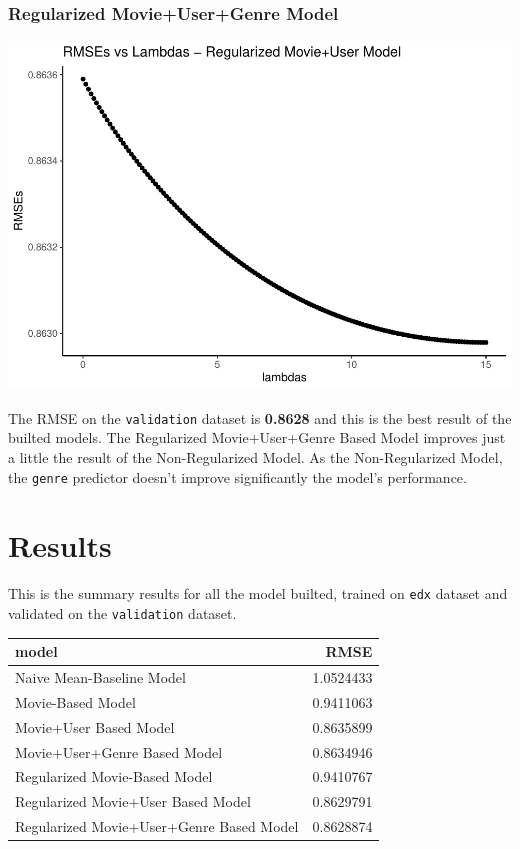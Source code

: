\documentclass[
]{article}
\begin{document}
\hypertarget{regularized-movieusergenre-model}{%
\subsubsection{Regularized Movie+User+Genre
Model}\label{regularized-movieusergenre-model}}

\begin{center}\includegraphics{MovieLens-Project-Report_files/figure-latex/unnamed-chunk-38-1} \end{center}

The RMSE on the \texttt{validation} dataset is \textbf{0.8628} and this
is the best result of the builted models. The Regularized
Movie+User+Genre Based Model improves just a little the result of the
Non-Regularized Model. As the Non-Regularized Model, the \texttt{genre}
predictor doesn't improve significantly the model's performance.

\hypertarget{results}{%
\section{Results}\label{results}}

This is the summary results for all the model builted, trained on
\texttt{edx} dataset and validated on the \texttt{validation} dataset.

\begin{table}[!h]
\centering\begingroup\fontsize{10}{12}\selectfont

\begin{tabular}{l|r}
\hline
model & RMSE\\
\hline
Naive Mean-Baseline Model & 1.0524433\\
\hline
Movie-Based Model & 0.9411063\\
\hline
Movie+User Based Model & 0.8635899\\
\hline
Movie+User+Genre Based Model & 0.8634946\\
\hline
Regularized Movie-Based Model & 0.9410767\\
\hline
Regularized Movie+User Based Model & 0.8629791\\
\hline
Regularized Movie+User+Genre Based Model & 0.8628874\\
\hline
\end{tabular}
\endgroup{}
\end{table}
\end{document}

